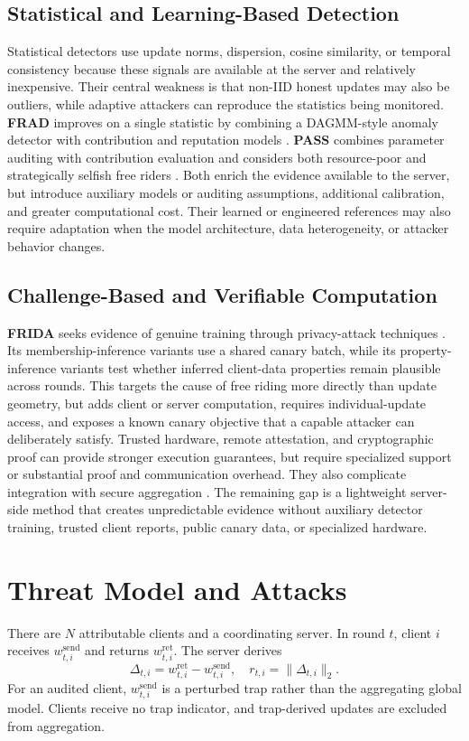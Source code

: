 \documentclass[conference]{IEEEtran}
\begin{document}
\subsection{Statistical and Learning-Based Detection}
Statistical detectors use update norms, dispersion, cosine similarity, or temporal consistency because these signals are available at the server and relatively inexpensive. Their central weakness is that non-IID honest updates may also be outliers, while adaptive attackers can reproduce the statistics being monitored. \textbf{FRAD} improves on a single statistic by combining a DAGMM-style anomaly detector with contribution and reputation models \cite{wang2024frad}. \textbf{PASS} combines parameter auditing with contribution evaluation and considers both resource-poor and strategically selfish free riders \cite{wang2023pass}. Both enrich the evidence available to the server, but introduce auxiliary models or auditing assumptions, additional calibration, and greater computational cost. Their learned or engineered references may also require adaptation when the model architecture, data heterogeneity, or attacker behavior changes.

\subsection{Challenge-Based and Verifiable Computation}
\textbf{FRIDA} seeks evidence of genuine training through privacy-attack techniques \cite{recasens2024frida}. Its membership-inference variants use a shared canary batch, while its property-inference variants test whether inferred client-data properties remain plausible across rounds. This targets the cause of free riding more directly than update geometry, but adds client or server computation, requires individual-update access, and exposes a known canary objective that a capable attacker can deliberately satisfy. Trusted hardware, remote attestation, and cryptographic proof can provide stronger execution guarantees, but require specialized support or substantial proof and communication overhead. They also complicate integration with secure aggregation \cite{bonawitz2017practical}. The remaining gap is a lightweight server-side method that creates unpredictable evidence without auxiliary detector training, trusted client reports, public canary data, or specialized hardware.

\section{Threat Model and Attacks}
There are $N$ attributable clients and a coordinating server. In round $t$, client $i$ receives $w^{\mathrm{send}}_{t,i}$ and returns $w^{\mathrm{ret}}_{t,i}$. The server derives
\begin{equation}
\Delta_{t,i}=w^{\mathrm{ret}}_{t,i}-w^{\mathrm{send}}_{t,i},
\quad r_{t,i}=\lVert\Delta_{t,i}\rVert_2.
\end{equation}
For an audited client, $w^{\mathrm{send}}_{t,i}$ is a perturbed trap rather than the aggregating global model. Clients receive no trap indicator, and trap-derived updates are excluded from aggregation.
\end{document}
